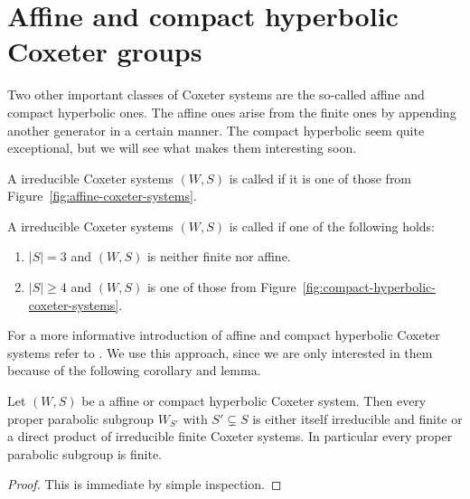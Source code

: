 \section{Affine and compact hyperbolic Coxeter groups}
\label{sec:coxeter-groups-affine-compact-hyperbolic}

Two other important classes of Coxeter systems are the so-called affine and compact hyperbolic ones. The affine ones arise from the finite ones by appending another generator in a certain manner. The compact hyperbolic seem quite exceptional, but we will see what makes them interesting soon.

\begin{defi}
	A irreducible Coxeter systems $(W,S)$ is called  if it is one of those from Figure~\ref{fig:affine-coxeter-systems}.
\end{defi}

\begin{defi}
	A irreducible Coxeter systems $(W,S)$ is called  if one of the following holds:

	\begin{enumerate}
		\item $|S| = 3$ and $(W,S)$ is neither finite nor affine.
		\item $|S| \geq 4$ and $(W,S)$ is one of those from Figure~\ref{fig:compact-hyperbolic-coxeter-systems}.
	\end{enumerate}
\end{defi}

For a more informative introduction of affine and compact hyperbolic Coxeter systems refer to \cite[Section 2.5, 6.7 -- 6.9]{humphreys:coxeter}. We use this approach, since we are only interested in them because of the following corollary and lemma.

\begin{coro}
	Let $(W,S)$ be a affine or compact hyperbolic Coxeter system. Then every proper parabolic subgroup $W_{S'}$ with $S' \subsetneq S$ is either itself irreducible and finite or a direct product of irreducible finite Coxeter systems. In particular every proper parabolic subgroup is finite.

	\begin{proof}
		This is immediate by simple inspection.
	\end{proof}
\end{coro}

